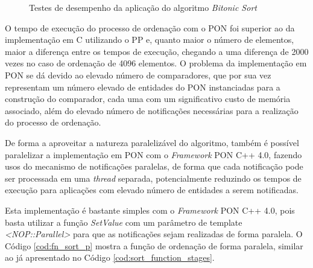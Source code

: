 \begin{figure}[!htb]
\centering
{}
\caption{Testes de desempenho da aplicação do algoritmo \textit{Bitonic Sort}}
\label{fig:bitonic_bench}
\end{figure}

O tempo de execução do processo de ordenação com o PON foi superior ao da
implementação em C utilizando o PP e, quanto maior o número de elementos, maior a
diferença entre os tempos de execução, chegando a uma diferença de 2000 vezes no
caso de ordenação de 4096 elementos. O problema da implementação em PON se dá
devido ao elevado número de comparadores, que por sua vez representam um número
elevado de entidades do PON instanciadas para a construção do comparador, cada
uma com um significativo custo de memória associado, além do elevado número de
notificações necessárias para a realização do processo de ordenação. 

De forma a aproveitar a natureza paralelizável do algoritmo, também é possível
paralelizar a implementação em PON com o \textit{Framework} PON C++ 4.0, fazendo
usos do mecanismo de notificações paralelas, de forma que cada notificação pode
ser processada em uma \textit{thread} separada, potencialmente reduzindo os
tempos de execução para aplicações com elevado número de entidades a serem
notificadas.

Esta implementação é bastante simples com o \textit{Framework} PON C++ 4.0, pois
basta utilizar a função \textit{SetValue} com um parâmetro de template
\textit{<NOP::Parallel>} para que as notificações sejam realizadas de forma
paralela. O Código \ref{cod:fn_sort_p} mostra a função de ordenação de forma
paralela, similar ao já apresentado no Código \ref{cod:sort_function_stages}.

